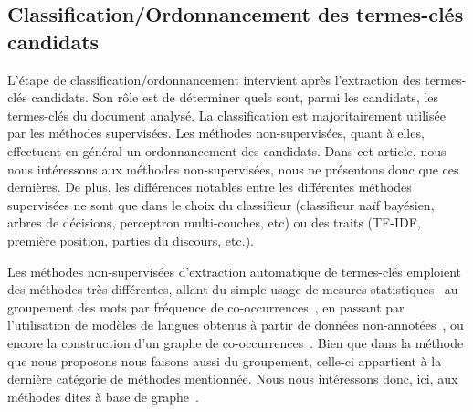   \subsection{Classification/Ordonnancement des termes-clés candidats}
  \label{subsec:classification_ordonnancement_des_termes_cles_candidats}
    L'étape de classification/ordonnancement intervient après l'extraction des
    termes-clés candidats. Son rôle est de déterminer quels sont, parmi les
    candidats, les termes-clés du document analysé. La classification est
    majoritairement utilisée par les méthodes supervisées. Les méthodes
    non-supervisées, quant à elles,  effectuent en général un ordonnancement des
    candidats. Dans cet article, nous nous intéressons aux méthodes
    non-supervisées, nous ne présentons donc que ces dernières. De plus, les
    différences notables entre les différentes méthodes supervisées ne sont que
    dans le choix du classifieur (classifieur naïf bayésien, arbres de
    décisions, perceptron multi-couches, etc) ou des traits (TF-IDF, première
    position, parties du discours, etc.).

    Les méthodes non-supervisées d'extraction automatique de termes-clés
    emploient des méthodes très différentes, allant du simple usage de mesures
    statistiques~\cite{jones1972tfidf,paukkeri2010likey} au groupement des mots
    par fréquence de co-occurrences~\cite{liu2009keycluster}, en passant par
    l'utilisation de modèles de langues obtenus à partir de données
    non-annotées~\cite{tomokiyo2003languagemodel}, ou encore la construction
    d'un graphe de co-occurrences~\cite{mihalcea2004textrank}. Bien que dans la
    méthode que nous proposons nous faisons aussi du groupement, celle-ci
    appartient à la dernière catégorie de méthodes mentionnée. Nous nous
    intéressons donc, ici, aux méthodes dites \og à base de graphe~\fg.


